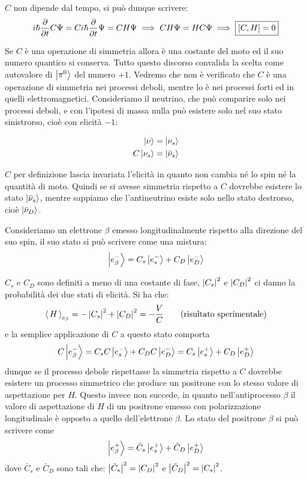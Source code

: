 $C$ non dipende dal tempo, si può dunque scrivere:
\begin{equation*}
 i\hbar \dfrac{\partial}{\partial t} C \Psi = C i \hbar 
\dfrac{\partial}{\partial t} \Psi = C H \Psi \implies C H \Psi = H C \Psi 
\implies \fbox{$[C, H] = 0$}
\end{equation*}

Se $C$ è una operazione di simmetria allora è una costante del moto ed il suo
numero quantico si conserva.
Tutto questo discorso convalida la scelta come autovalore di $\Ket{\pi^0}$ del
numero $+1$.
Vedremo che non è verificato che $C$ è una operazione di simmetria nei 
processi
deboli, mentre lo è nei processi forti ed in quelli elettromagnetici.
Consideriamo il neutrino, che può comparire solo nei processi deboli, e con
l'ipotesi di massa nulla può esistere solo nel suo stato sinistrorso, cioè con
elicità $-1$:

\begin{align*}
\Ket{\nu} &= \Ket{\nu_s} \\
C \Ket{\nu_s} &= \Ket{\bar{\nu}_s}
\end{align*}

$C$ per definizione lascia invariata l'elicità in quanto non cambia né lo spin
né la quantità di moto. Quindi se si avesse simmetria rispetto a $C$ dovrebbe
esistere lo stato $\Ket{\bar{\nu}_s}$, mentre sappiamo che l'antineutrino
esiste solo nello stato destrorso, cioè $\Ket{\bar{\nu}_D}$.

Consideriamo un elettrone $\beta$ emesso longitudinalmente rispetto alla
direzione del suo spin, il suo stato si può scrivere come una
mistura:
\begin{equation*}
\Ket{e^-_\beta} = C_s \Ket{e^-_s} + C_D \Ket{e^-_D}
\end{equation*}

$C_s$ e $C_D$ sono definiti a meno di una costante di fase, $\left| C_s \right|^2$ e
$\left| C_D \right|^2$ ci danno la probabilità dei due stati di elicità. Si ha che:
\begin{equation*}
  \left\langle\, H \,\right\rangle_{e_{\beta}} = - \left| C_s \right|^2 + \left| C_D \right|^2 = - \frac{V}{C} \qquad 
\text{(risultato sperimentale)}
\end{equation*}
e la semplice applicazione di $C$ a questo stato comporta
\begin{equation*}
C\Ket{e^-_\beta} = C_s C \Ket{e^-_s} + C_D C \Ket{e^-_D} = C_s \Ket{e^+_s} + 
C_D\Ket{e^+_D}
\end{equation*}
dunque se il processo debole rispettasse la simmetria rispetto a $C$ dovrebbe
esistere un processo simmetrico che produce un positrone con lo stesso valore di
aspettazione per $H$.  Questo invece non
succede, in quanto nell'antiprocesso $\beta$ il valore di aspettazione di $H$ di
un positrone emesso con polarizzazione longitudinale è opposto a quello
dell'elettrone $\beta$. Lo stato del positrone $\beta$ si può scrivere come
\begin{equation*}
\Ket{e^+_\beta} = \bar{C}_s \Ket{e^+_s} + \bar{C}_D \Ket{e^+_D}
\end{equation*}
dove $\bar{C}_s$ e $\bar{C}_D$ sono tali che: $\left| \bar{C}_s \right|^2 = \left| C_D \right|^2$
e $\left| \bar{C}_D \right|^2 = \left| C_s \right|^2$.

